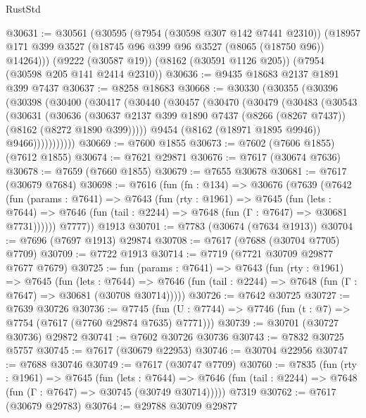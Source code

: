 \begin{lexlean}{RustStd}
\begin{coremodule}
@30631 := @30561
    (@30595
      (@7954 (@30598 @307 @142 @7441 @2310))
      (@18957 @171 @399 @3527 (@18745 @96 @399 @96 @3527 (@8065 (@18750 @96)) @14264)))
    (@9222 (@30587 @19))
    (@8162 (@30591 @1126 @205))
    (@7954 (@30598 @205 @141 @2414 @2310))
@30636 := @9435 @18683 @2137 @1891 @399 @7437
@30637 := @8258 @18683
@30668 := @30330
    (@30355
      (@30396
        (@30398
          (@30400
            (@30417
              (@30440
                (@30457
                  (@30470
                    (@30479
                      (@30483
                        (@30543
                          (@30631
                            (@30636
                              (@30637
                                @2137
                                @399
                                @1890
                                @7437
                                (@8266 (@8267 @7437))
                                (@8162 (@8272 @1890 @399)))))
                          @9454
                          (@8162 (@18971 @1895 @9946))
                          @9466)))))))))))
@30669 := @7600 @1855
@30673 := @7602 (@7606 @1855) (@7612 @1855)
@30674 := @7621 @29871
@30676 := @7617 (@30674 @7636)
@30678 := @7659 (@7660 @1855)
@30679 := @7655 @30678
@30681 := @7617 (@30679 @7684)
@30698 := @7616
    (fun (fn : @134) =>
    @30676
      (@7639
        (@7642
          (fun (params : @7641) =>
          @7643
            (fun (rty : @1961) =>
            @7645
              (fun (lets : @7644) =>
              @7646 (fun (tail : @2244) => @7648 (fun (Γ : @7647) => @30681 @7731))))))
        @7777))
    @1913
@30701 := @7783 (@30674 (@7634 @1913))
@30704 := @7696 (@7697 @1913) @29874
@30708 := @7617 (@7688 (@30704 @7705) @7709)
@30709 := @7722 @1913
@30714 := @7719 (@7721 @30709 @29877 @7677 @7679)
@30725 := fun (params : @7641) =>
  @7643
    (fun (rty : @1961) =>
    @7645
      (fun (lets : @7644) =>
      @7646 (fun (tail : @2244) => @7648 (fun (Γ : @7647) => @30681 (@30708 @30714)))))
@30726 := @7642 @30725
@30727 := @7639 @30726
@30736 := @7745
    (fun (U : @7744) => @7746 (fun (t : @7) => @7754 (@7617 (@7760 @29874 @7635) @7771)))
@30739 := @30701 (@30727 @30736) @29872
@30741 := @7602 @30726 @30736
@30743 := @7832 @30725 @5757
@30745 := @7617 (@30679 @22953)
@30746 := @30704 @22956
@30747 := @7688 @30746
@30749 := @7617 (@30747 @7709)
@30760 := @7835
    (fun (rty : @1961) =>
    @7645
      (fun (lets : @7644) =>
      @7646 (fun (tail : @2244) => @7648 (fun (Γ : @7647) => @30745 (@30749 @30714)))))
    @7319
@30762 := @7617 (@30679 @29783)
@30764 := @29788 @30709 @29877

\end{coremodule}
\end{lexlean}
